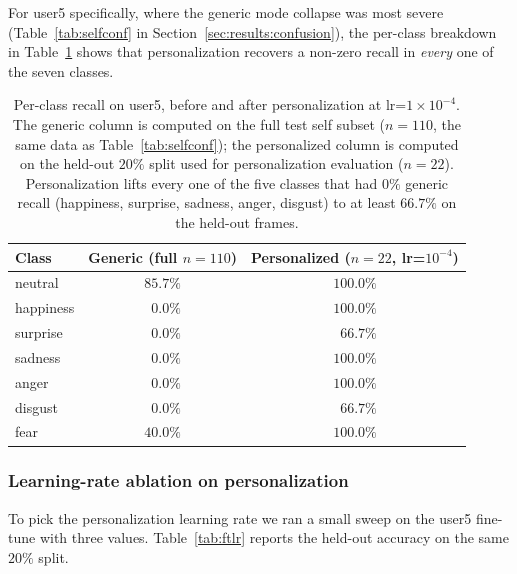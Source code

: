 \documentclass[12pt,a4paper]{article}
\begin{document}
For user5 specifically, where the generic mode collapse was
most severe (Table~\ref{tab:selfconf} in
Section~\ref{sec:results:confusion}), the per-class breakdown
in Table~\ref{tab:user5class} shows that personalization
recovers a non-zero recall in \emph{every} one of the seven
classes.

\begin{table}[H]
  \centering
  \footnotesize
  \begin{tabular}{lcc}
    \toprule
    Class & Generic (full $n=110$) & Personalized ($n=22$, lr=$10^{-4}$) \\
    \midrule
    neutral   & $85.7\%$ & $100.0\%$ \\
    happiness & $\phantom{0}0.0\%$  & $100.0\%$ \\
    surprise  & $\phantom{0}0.0\%$  & $\phantom{0}66.7\%$ \\
    sadness   & $\phantom{0}0.0\%$  & $100.0\%$ \\
    anger     & $\phantom{0}0.0\%$  & $100.0\%$ \\
    disgust   & $\phantom{0}0.0\%$  & $\phantom{0}66.7\%$ \\
    fear      & $40.0\%$ & $100.0\%$ \\
    \bottomrule
  \end{tabular}
  \caption{Per-class recall on user5, before and after
  personalization at lr=$1\times 10^{-4}$. The generic column
  is computed on the full test self subset ($n=110$, the same
  data as Table~\ref{tab:selfconf}); the personalized column
  is computed on the held-out $20\%$ split used for
  personalization evaluation ($n=22$). Personalization lifts
  every one of the five classes that had $0\%$ generic recall
  (happiness, surprise, sadness, anger, disgust) to at least
  $66.7\%$ on the held-out frames.}
  \label{tab:user5class}
\end{table}

\subsubsection*{Learning-rate ablation on personalization}

To pick the personalization learning rate we ran a small
sweep on the user5 fine-tune with three values.
Table~\ref{tab:ftlr} reports the held-out accuracy on the
same $20\%$ split.
\end{document}
